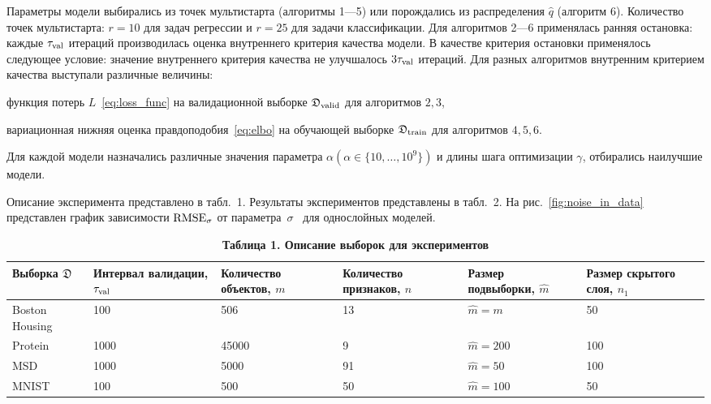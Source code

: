 \documentclass[12pt]{a&t}
\begin{document}
Параметры модели выбирались из точек мультистарта (алгоритмы 1---5) или порождались из распределения $\hat{q}$ (алгоритм 6). Количество точек мультистарта: $r=10$ {для задач регрессии и $r=25$ для задачи классификации}.
Для алгоритмов 2---6 применялась ранняя остановка: каждые $\tau_\textnormal{val}$ итераций производилась оценка внутреннего критерия качества модели. В качестве критерия остановки применялось следующее условие: значение внутреннего критерия качества не улучшалось $3\tau_\textnormal{val}$ итераций. Для разных алгоритмов внутренним критерием качества выступали различные величины:
\begin{enumlist}[.]
\item функция потерь $L$~\eqref{eq:loss_func} на валидационной выборке $\mathfrak{D}_\textnormal{valid}$ для алгоритмов $2,3$,
\item вариационная нижняя оценка правдоподобия~\eqref{eq:elbo} на обучающей выборке $\mathfrak{D}_\textnormal{train}$ для алгоритмов $4,5,6$.
\end{enumlist}

Для каждой модели назначались различные значения параметра $\alpha (\alpha \in \{10, \dots, 10^9\})$ и длины шага оптимизации $\gamma$, отбирались наилучшие модели. %



Описание эксперимента представлено в табл.~1. Результаты экспериментов представлены в табл.~2. На рис.~\ref{fig:noise_in_data} представлен график зависимости $\textnormal{RMSE}_{\sigma}$ от параметра~$\sigma$~{ для однослойных моделей}. 

\begin{table}[!htbp]
\captionsetup{justification=raggedright,singlelinecheck=false}
\label{table1}
\caption*{\textbf{Таблица 1. Описание выборок для экспериментов}}
\footnotesize
\centering

\begin{tabular}{ | p{2cm} |p{2cm} | p{2cm} | p{2cm} | p{2cm} | p{2cm} | }
\hline
Выборка $\mathfrak{D}$ & Интервал валидации, $\tau_\textnormal{val}$ & Количество объектов, $m$ & Количество признаков, $n$ & Размер подвыборки, $\hat{m}$ &  Размер скрытого слоя, $n_1$ \\
\hline
Boston Housing & 100 & 506 & 13 & $\hat{m} = m$ & 50 \\
\hline
Protein & 1000 & 45000 & 9 & $\hat{m} = 200$ & 100 \\
\hline
MSD & 1000& 5000 & 91 & $\hat{m} = 50$ & 100\\
\hline
MNIST & 100  & 500 & 50 & $\hat{m} = 100$ & 50\\ 
\hline
\end{tabular}
\end{table}
\end{document}
